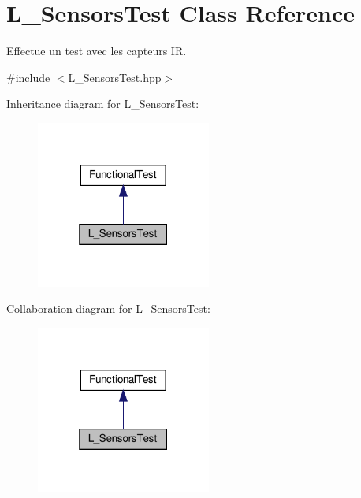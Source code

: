 \hypertarget{classL__SensorsTest}{}\section{L\+\_\+\+Sensors\+Test Class Reference}
\label{classL__SensorsTest}


Effectue un test avec les capteurs IR.  




{\ttfamily \#include $<$L\+\_\+\+Sensors\+Test.\+hpp$>$}



Inheritance diagram for L\+\_\+\+Sensors\+Test\+:
\nopagebreak
\begin{figure}[H]
\begin{center}
\leavevmode
\includegraphics[width=163pt]{classL__SensorsTest__inherit__graph}
\end{center}
\end{figure}


Collaboration diagram for L\+\_\+\+Sensors\+Test\+:
\nopagebreak
\begin{figure}[H]
\begin{center}
\leavevmode
\includegraphics[width=163pt]{classL__SensorsTest__coll__graph}
\end{center}
\end{figure}

